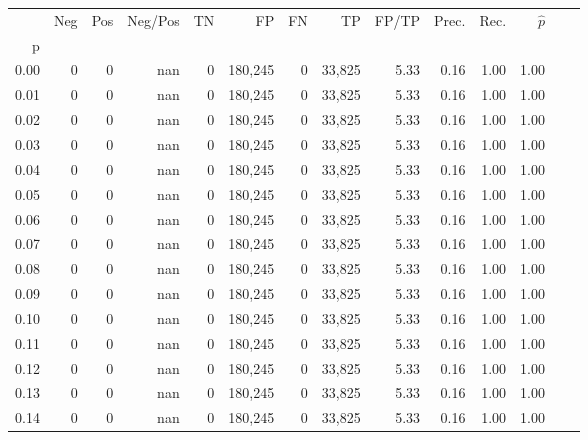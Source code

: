 \begin{tabular}{rrrrrrrrrrrrrr}
\toprule
{} &     Neg &    Pos & Neg/Pos &       TN &       FP &      FN &      TP & FP/TP & Prec. &  Rec. & $\hat{p}$ \\
p    &         &        &         &          &          &         &         &       &       &       &           \\
\midrule
0.00 &       0 &      0 &     nan &        0 &  180,245 &       0 &  33,825 &  5.33 &  0.16 &  1.00 &      1.00 \\
0.01 &       0 &      0 &     nan &        0 &  180,245 &       0 &  33,825 &  5.33 &  0.16 &  1.00 &      1.00 \\
0.02 &       0 &      0 &     nan &        0 &  180,245 &       0 &  33,825 &  5.33 &  0.16 &  1.00 &      1.00 \\
0.03 &       0 &      0 &     nan &        0 &  180,245 &       0 &  33,825 &  5.33 &  0.16 &  1.00 &      1.00 \\
0.04 &       0 &      0 &     nan &        0 &  180,245 &       0 &  33,825 &  5.33 &  0.16 &  1.00 &      1.00 \\
0.05 &       0 &      0 &     nan &        0 &  180,245 &       0 &  33,825 &  5.33 &  0.16 &  1.00 &      1.00 \\
0.06 &       0 &      0 &     nan &        0 &  180,245 &       0 &  33,825 &  5.33 &  0.16 &  1.00 &      1.00 \\
0.07 &       0 &      0 &     nan &        0 &  180,245 &       0 &  33,825 &  5.33 &  0.16 &  1.00 &      1.00 \\
0.08 &       0 &      0 &     nan &        0 &  180,245 &       0 &  33,825 &  5.33 &  0.16 &  1.00 &      1.00 \\
0.09 &       0 &      0 &     nan &        0 &  180,245 &       0 &  33,825 &  5.33 &  0.16 &  1.00 &      1.00 \\
0.10 &       0 &      0 &     nan &        0 &  180,245 &       0 &  33,825 &  5.33 &  0.16 &  1.00 &      1.00 \\
0.11 &       0 &      0 &     nan &        0 &  180,245 &       0 &  33,825 &  5.33 &  0.16 &  1.00 &      1.00 \\
0.12 &       0 &      0 &     nan &        0 &  180,245 &       0 &  33,825 &  5.33 &  0.16 &  1.00 &      1.00 \\
0.13 &       0 &      0 &     nan &        0 &  180,245 &       0 &  33,825 &  5.33 &  0.16 &  1.00 &      1.00 \\
0.14 &       0 &      0 &     nan &        0 &  180,245 &       0 &  33,825 &  5.33 &  0.16 &  1.00 &      1.00 \\

\end{tabular}

